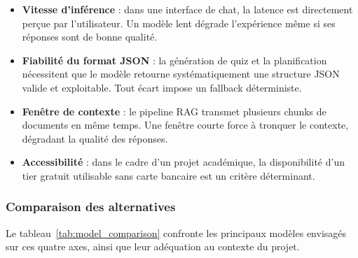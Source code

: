 \begin{itemize}
    \item \textbf{Vitesse d'inférence} : dans une interface de chat, la latence
    est directement perçue par l'utilisateur. Un modèle lent dégrade l'expérience
    même si ses réponses sont de bonne qualité.

    \item \textbf{Fiabilité du format JSON} : la génération de quiz et la
    planification nécessitent que le modèle retourne systématiquement une structure
    JSON valide et exploitable. Tout écart impose un fallback déterministe.

    \item \textbf{Fenêtre de contexte} : le pipeline RAG transmet plusieurs chunks
    de documents en même temps. Une fenêtre courte force à tronquer le contexte,
    dégradant la qualité des réponses.

    \item \textbf{Accessibilité} : dans le cadre d'un projet académique, la
    disponibilité d'un tier gratuit utilisable sans carte bancaire est un critère
    déterminant.
\end{itemize}

\subsubsection*{Comparaison des alternatives}

Le tableau~\ref{tab:model_comparison} confronte les principaux modèles envisagés
sur ces quatre axes, ainsi que leur adéquation au contexte du projet.

